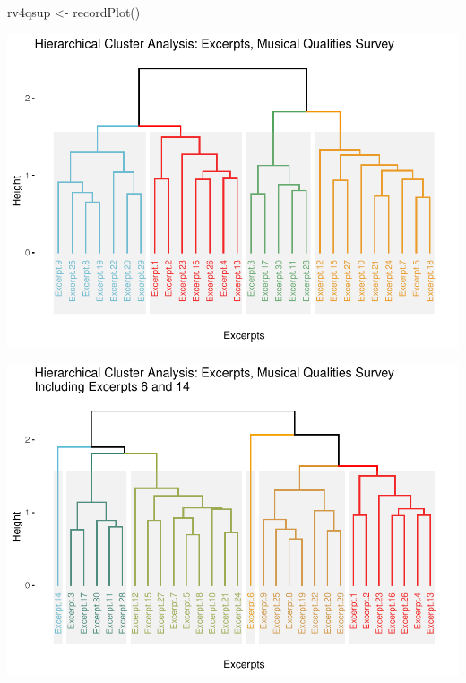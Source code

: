 \documentclass[
]{article}
\newenvironment{Shaded}{\begin{snugshade}}{\end{snugshade}}
\newcommand{\FunctionTok}[1]{\textcolor[rgb]{0.00,0.00,0.00}{#1}}
\newcommand{\NormalTok}[1]{#1}
\newcommand{\OtherTok}[1]{\textcolor[rgb]{0.56,0.35,0.01}{#1}}
\begin{document}
\begin{Shaded}
\begin{Highlighting}[]
\NormalTok{rv4qsup }\OtherTok{\textless{}{-}} \FunctionTok{recordPlot}\NormalTok{()}
\end{Highlighting}
\end{Shaded}

\begin{center}\includegraphics{MusDes_Supplementary_files/figure-latex/HCA-1} \end{center}

\begin{center}\includegraphics{MusDes_Supplementary_files/figure-latex/HCAW6-1} \end{center}
\end{document}
